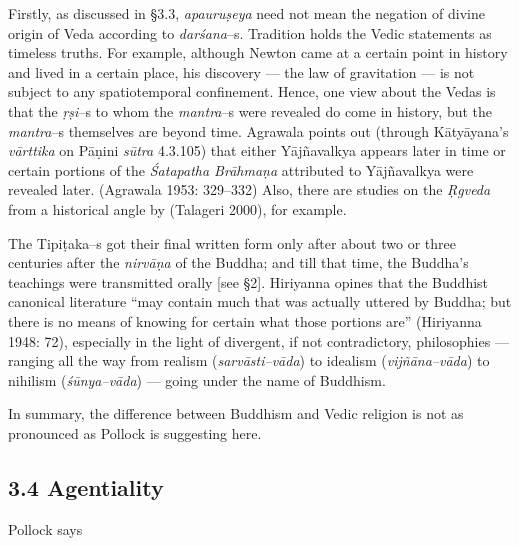 Firstly, as discussed in §3.3, \textit{apauruṣeya} need not mean the negation of divine origin of Veda according to \textit{darśana}–s. Tradition holds the Vedic statements as timeless truths. For example, although Newton came at a certain point in history and lived in a certain place, his discovery — the law of gravitation — is not subject to any spatiotemporal confinement. Hence, one view about the Vedas is that the \textit{ṛṣi}–s to whom the \textit{mantra}–s were revealed do come in history, but the \textit{mantra}–s themselves are beyond time. Agrawala points out (through Kātyāyana’s \textit{vārttika} on Pāṇini \textit{sūtra }4.3.105) that either Yājñavalkya appears later in time or certain portions of the \textit{Śatapatha Brāhmaṇa }attributed to Yājñavalkya were revealed later. (Agrawala 1953: 329–332) Also, there are studies on the \textit{Ṛgveda} from a historical angle by (Talageri 2000), for example.

The Tipiṭaka–s got their final written form only after about two or three centuries after the \textit{nirvāṇa }of the Buddha; and till that time, the Buddha’s teachings were transmitted orally [see §2]. Hiriyanna opines that the Buddhist canonical literature “may contain much that was actually uttered by Buddha; but there is no means of knowing for certain what those portions are” (Hiriyanna 1948: 72), especially in the light of divergent, if not contradictory, philosophies — ranging all the way from realism (\textit{sarvāsti–vāda}) to idealism (\textit{vijñāna–vāda}) to nihilism (\textit{śūnya–vāda}) — going under the name of Buddhism.

In summary, the difference between Buddhism and Vedic religion is not as pronounced as Pollock is suggesting here.


\subsection*{3.4 Agentiality}

Pollock says

